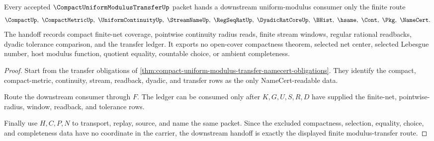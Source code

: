 \begin{theorem}
\label{thm:compact-uniform-modulus-transfer-handoff}
Every accepted $\CompactUniformModulusTransferUp$ packet hands a downstream uniform-modulus consumer only the finite route
$$
\CompactUp,\ \CompactMetricUp,\ \UniformContinuityUp,\ \StreamNameUp,\ \RegSeqRatUp,\ \DyadicRatCoreUp,\ \BHist,\ \hsame,\ \Cont,\ \Pkg,\ \NameCert .
$$
The handoff records compact finite-net coverage, pointwise continuity radius reads, finite stream windows, regular rational readbacks, dyadic tolerance comparison, and the transfer ledger. It exports no open-cover compactness theorem, selected net center, selected Lebesgue number, host modulus function, quotient equality, countable choice, or ambient completeness.
\end{theorem}
\begin{proof}
Start from the transfer obligations of \autoref{thm:compact-uniform-modulus-transfer-namecert-obligations}. They identify the compact, compact-metric, continuity, stream, readback, dyadic, and transfer rows as the only NameCert-readable data.

Route the downstream consumer through $F$. The ledger can be consumed only after $K,G,U,S,R,D$ have supplied the finite-net, pointwise-radius, window, readback, and tolerance rows.

Finally use $H,C,P,N$ to transport, replay, source, and name the same packet. Since the excluded compactness, selection, equality, choice, and completeness data have no coordinate in the carrier, the downstream handoff is exactly the displayed finite modulus-transfer route.
\end{proof}

\begin{closurestatus}{\CompactUniformModulusTransferUp}
  \theoryclosure{\seedClosure}
  \formalstatus{\theoremCheckedV}
\end{closurestatus}
